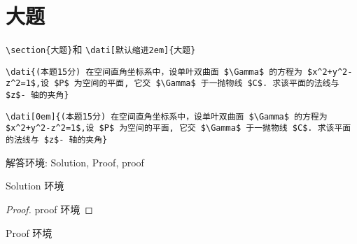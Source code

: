 \documentclass[11pt,twoside]{article}
\begin{document}
\section{大题}
\lstinline[style = iltx]|\section{大题}|和
\lstinline[style=iltx]|\dati[默认缩进2em]{大题}|
\begin{lstlisting}[style=tsdtex]
\dati{(本题15分) 在空间直角坐标系中，设单叶双曲面 $\Gamma$ 的方程为 $x^2+y^2-z^2=1$,设 $P$ 为空间的平面, 它交 $\Gamma$ 于一抛物线 $C$. 求该平面的法线与 $z$- 轴的夹角}
\end{lstlisting}
\vspace{1ex}

\begin{lstlisting}[style=tsdtex]
\dati[0em]{(本题15分) 在空间直角坐标系中，设单叶双曲面 $\Gamma$ 的方程为 $x^2+y^2-z^2=1$,设 $P$ 为空间的平面, 它交 $\Gamma$ 于一抛物线 $C$. 求该平面的法线与 $z$- 轴的夹角}
\end{lstlisting}
\vspace{1ex}

\vspace{2.5ex}
\noindent 解答环境: Solution, Proof, proof
\begin{Solution}
Solution 环境
\end{Solution}

\begin{proof}
proof 环境
\end{proof}

\begin{Proof}
Proof 环境
\end{Proof}
\end{document}

